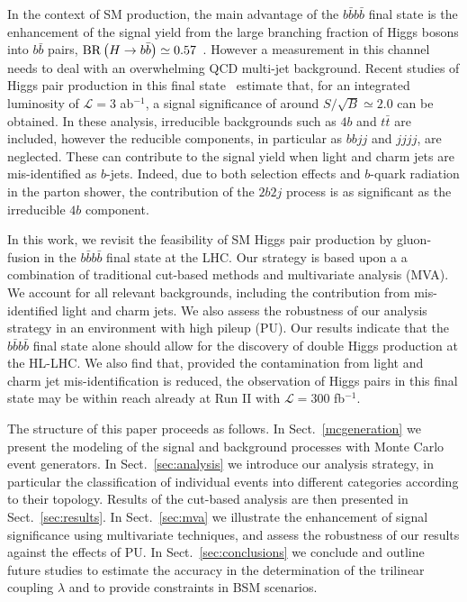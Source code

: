 In the context of SM production,
the main advantage of the $b\bar{b}b\bar{b}$ final state is the
enhancement of the signal yield
from the large branching fraction of Higgs bosons into
$b\bar{b}$
pairs, ${\rm BR}\left( H\to b\bar{b}\right)\simeq 0.57$~\cite{Dittmaier:2012vm}.
%
However a measurement in this channel
needs to deal with an overwhelming QCD multi-jet background.
%
Recent studies of Higgs pair production in this
final state~\cite{Wardrope:2014kya,deLima:2014dta}
estimate that, for an integrated
luminosity of
$\mathcal{L}=3$ ab$^{-1}$,
a signal significance of around $S/\sqrt{B}\simeq 2.0$ can be obtained.
%
In these analysis, irreducible backgrounds such as $4b$ and
$t\bar{t}$ are included, however the
reducible components, in particular as $bbjj$ and
$jjjj$, are neglected.
%
These can contribute to the signal yield when 
light and charm jets are mis-identified as $b$-jets.
%
Indeed, due to both
selection effects and $b$-quark radiation in the
parton shower, the
contribution of the $2b2j$ process is as significant as
the irreducible $4b$ component.

In this work, we revisit the feasibility of SM Higgs pair production by
gluon-fusion
in the $b\bar{b}b\bar{b}$ final state at the LHC.
%
 Our strategy is based upon a a combination of traditional cut-based
 methods and multivariate analysis (MVA).
  We account for  all relevant
  backgrounds, including the contribution from mis-identified
  light and charm jets.
  We also assess the robustness of our analysis strategy in
  an environment with high pileup (PU).
 Our results indicate that 
  the $b\bar{b}b\bar{b}$ 
final state
alone should allow for the discovery of double Higgs production
  at the HL-LHC.
  We also find that, provided the contamination from light and charm jet
  mis-identification is reduced, the observation of Higgs pairs
  in this final state may be within reach already at Run II with
  $\mathcal{L}=300$ fb$^{-1}$.
  
The structure of this paper proceeds as follows.
%
In Sect.~\ref{mcgeneration} we present the modeling of the signal
and background processes with Monte Carlo event generators.
%
In Sect.~\ref{sec:analysis}
we introduce our analysis strategy, in particular
the classification of individual events into
different categories according to their topology.
%
Results of the cut-based analysis
are then presented in Sect.~\ref{sec:results}.
%
In Sect.~\ref{sec:mva} we illustrate the enhancement of signal
significance using multivariate techniques, and
assess the robustness of our results against the effects of PU.
%
In Sect.~\ref{sec:conclusions} we conclude and outline
future studies to estimate the accuracy
in the determination of the trilinear coupling $\lambda$ and
to provide
 constraints in
BSM scenarios.

